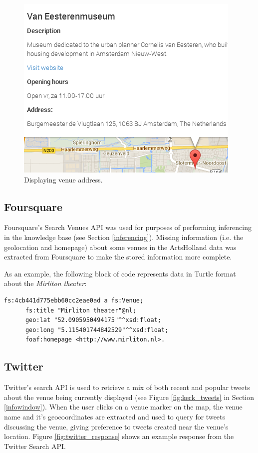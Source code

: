 \documentclass[hidelinks,a4paper]{article}
\begin{document}
\begin{figure}[h!]
  \centering
    \includegraphics[]{images/geocode_find_address.png}    
    \caption{Displaying venue address.}
    \label{fig:reverse_geocoding_address}
\end{figure}


\subsection{Foursquare}\label{foursquare}
Foursquare's Search Venues API \cite{foursquare_api} was used for purposes of performing inferencing in the knowledge base (see Section \ref{inferencing}). Missing information (i.e. the geolocation and homepage) about some venues in the ArtsHolland data was extracted from Foursquare to make the stored information more complete.

As an example, the following block of code represents data in Turtle format about the \emph{Mirliton theater}:

\indent
\begin{verbatim}
fs:4cb441d775ebb60cc2eae0ad a fs:Venue;
      fs:title "Mirliton theater"@nl;
      geo:lat "52.0905950494175"^^xsd:float;
      geo:long "5.115401744842529"^^xsd:float;
      foaf:homepage <http://www.mirliton.nl>.
\end{verbatim}

\subsection{Twitter}
Twitter's search API \cite{twitter_api} is used to retrieve a mix of both recent and popular tweets about the venue being currently displayed (see Figure \ref{fig:kerk_tweets} in Section \ref{infowindow}). When the user clicks on a venue marker on the map, the venue name and it's geocoordinates are extracted and used to query for tweets discussing the venue, giving preference to tweets created near the venue's location. Figure \ref{fig:twitter_response} shows an example response from the Twitter Search API.
\end{document}
